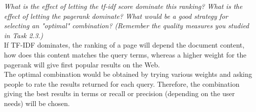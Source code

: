 \begin{itemize}
\textit{What is the effect of letting the tf-idf score dominate this ranking? What is the effect of letting the pagerank dominate? What would be a good strategy for selecting an "optimal" combination? (Remember the quality measures you studied in Task 2.3.)}\\

If TF-IDF dominates, the ranking of a page will depend the document content, how does this content matches the query terms, whereas a higher weight for the pagerank will give first popular results on the Web.\\

The optimal combination would be obtained by trying various weights and asking people to rate the results returned for each query. Therefore, the combination giving the best results in terms or recall or precision (depending on the user needs) will be chosen.

\end{itemize}
